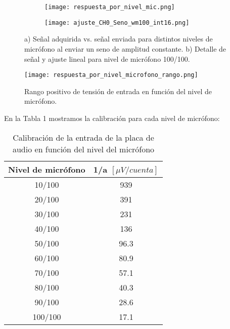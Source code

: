 \documentclass[a4paper, 11pt]{article}
\begin{document}
\begin{figure}[H]
        \begin{subfigure}[b]{0.5\textwidth}
                \centering
                \texttt{[image: respuesta\_por\_nivel\_mic.png]}
                \caption{} \label{fig:calibmic}
        \end{subfigure}%
        \begin{subfigure}[b]{0.5\textwidth}
                \centering
                \texttt{[image: ajuste\_CH0\_Seno\_wm100\_int16.png]}
                \caption{} \label{fig:ejemplo_rangomic}
        \end{subfigure}%
        \caption{a) Señal adquirida vs. señal enviada para distintos niveles de micrófono al enviar un seno de amplitud constante. b) Detalle de señal y ajuste lineal para nivel de micrófono 100/100.}\label{fig:calib_microfono}
\end{figure}

\begin{figure} [H]
\centering
\texttt{[image: respuesta\_por\_nivel\_microfono\_rango.png]}
\caption{Rango positivo de tensión de entrada en función del nivel de micrófono.\label{fig:calib_microfono}}
\end{figure} 

 En la Tabla 1 mostramos la calibración para cada nivel de micrófono:

\begin {table}[H]
\begin {center}
 \begin{tabular} {|c|c|}
        \hline
        Nivel de micrófono &  1/a  $[\mu V/cuenta]$ \\
        \hline
        10/100 & 939\\
        \hline
        20/100 & 391\\
        \hline
        30/100 & 231\\
        \hline
        40/100 & 136\\
        \hline
        50/100 & 96.3\\
        \hline
        60/100 & 80.9\\
        \hline
        70/100 & 57.1\\
        \hline
        80/100 & 40.3\\
        \hline
        90/100 & 28.6\\
        \hline
        100/100 & 17.1\\
        \hline
 \end{tabular}
 \caption{Calibración de la entrada de la placa de audio en función del nivel del micrófono}
 \label{table1}
 \end{center}
\end{table}
\end{document}
